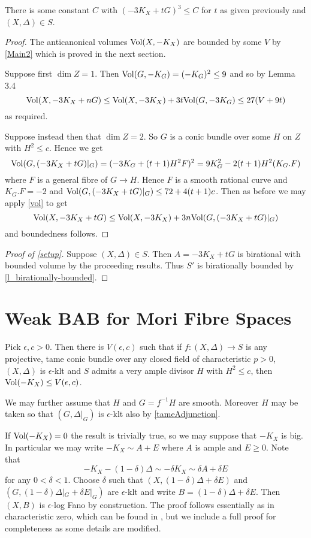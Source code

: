 \begin{lemma}
	There is some constant $C$ with $(-3K_{X}+tG)^{3} \leq C$ for $t$ as given previously and $(X,\Delta)\in S$.
\end{lemma}

\begin{proof}
	The anticanonical volumes $\text{Vol}(X,-K_{X})$ are bounded by some $V$ by \autoref{Main2} which is proved in the next section.
	
	Suppose first $\dim Z=1$. Then $\text{Vol}(G,-K_{G})=(-K_{G})^{2} \leq 9$ and so by Lemma 3.4
	\[\text{Vol}(X,-3K_{X}+nG) \leq \text{Vol}(X,-3K_{X}) + 3t\text{Vol}(G,-3K_{G})\leq 27(V+9t)\]
	as required.

	Suppose instead then that $\dim Z=2$. So $G$ is a conic bundle over some $H$ on $Z$ with $H^{2} \leq c$. Hence we get
	\[\text{Vol}(G,(-3K_{X}+tG)|_{G})= (-3K_{G}+(t+1)H^{2}F)^{2}=9K_{G}^{2}-2(t+1)H^{2}(K_{G}.F)\]
	where $F$ is a general fibre of $G \to H$. Hence $F$ is a smooth rational curve and $K_{G}.F=-2$ and $\text{Vol}(G,(-3K_{X}+tG)|_{G})\leq 72+4(t+1)c$. Then as before we may apply \autoref{vol} to get 
	\[\text{Vol}(X,-3K_{X}+tG) \leq \text{Vol}(X,-3K_{X}) + 3n\text{Vol}(G,(-3K_{X}+tG)|_{G})\]
	and boundedness follows.
\end{proof}

\begin{proof}[Proof of \autoref{setup}]
	Suppose $(X,\Delta) \in S$. Then $A=-3K_{X}+tG$ is birational with bounded volume by the proceeding results. Thus $S'$ is birationally bounded by \autoref{l_birationally-bounded}.
	\end{proof}

\section{Weak BAB for Mori Fibre Spaces}
	\begin{theorem}\label{J1}
	Pick $\epsilon,c >0$. Then there is $V(\epsilon,c)$ such that if $f\colon (X,\Delta) \to S$ is any projective, tame conic bundle over any closed field of characteristic $p> 0$, $(X,\Delta)$ is $\epsilon$-klt and $S$ admits a very ample divisor $H$ with $H^{2} \leq c$, then $\text{Vol}(-K_{X}) \leq V(\epsilon,c)$. 
\end{theorem}

We may further assume that $H$ and $G=f^{-1}H$ are smooth. Moreover $H$ may be taken so that $(G,\Delta|_{G})$ is $\epsilon$-klt also by \autoref{tameAdjunction}.

If $\text{Vol}(-K_{X})=0$ the result is trivially true, so we may suppose that $-K_{X}$ is big. In particular we may write $-K_{X}\sim A+E$ where $A$ is ample and $E \geq 0$. Note that $$-K_{X}-(1-\delta)\Delta\sim -\delta K_{X} \sim \delta A + \delta E$$ for any $0 < \delta <1$. Choose $\delta$ such that $(X,(1-\delta)\Delta+\delta E)$ and $(G,(1-\delta)\Delta|_{G}+\delta E|_{G})$ are $\epsilon$-klt and write $B=(1-\delta)\Delta+\delta E$. Then $(X,B)$ is $\epsilon$-log Fano by construction. The proof follows essentially as in characteristic zero, which can be found in \cite{jiang2014boundedness}, but we include a full proof for completeness as some details are modified.

